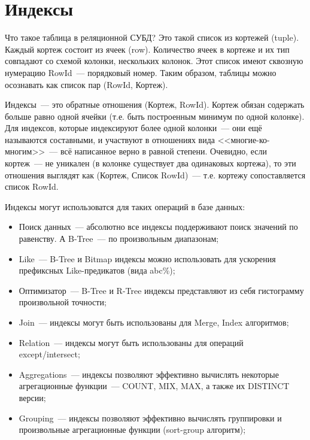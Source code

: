 \chapter{Индексы}

\begin{epigraphs}
\end{epigraphs}

Что такое таблица в реляционной СУБД? Это такой список из кортежей (tuple). Каждый кортеж состоит из ячеек (row). Количество ячеек в кортеже и их тип совпадают со схемой колонки, нескольких колонок. Этот список имеют сквозную нумерацию RowId~--- порядковый номер. Таким образом, таблицы можно осознавать как список пар (RowId, Кортеж).

Индексы~--- это обратные отношения (Кортеж, RowId). Кортеж обязан содержать больше равно одной ячейки (т.е. быть построенным минимум по одной колонке). Для индексов, которые индексируют более одной колонки~--- они ещё называются составными, и участвуют в отношениях вида <<многие-ко-многим>>~--- всё написанное верно в равной степени. Очевидно, если кортеж~--- не уникален (в колонке существует два одинаковых кортежа), то эти отношения выглядят как (Кортеж, Список RowId)~--- т.е. кортежу сопоставляется список RowId.

Индексы могут использоватся для таких операций в базе данных:

\begin{itemize}
  \item Поиск данных~--- абсолютно все индексы поддерживают поиск значений по равенству. А B-Tree~--- по произвольным диапазонам;
  \item Like~--- B-Tree и Bitmap индексы можно использовать для ускорения префиксных Like-предикатов (вида abc\%);
  \item Оптимизатор~--- B-Tree и R-Tree индексы представляют из себя гистограмму произвольной точности;
  \item Join~--- индексы могут быть использованы для Merge, Index алгоритмов;
  \item Relation~--- индексы могут быть использованы для операций except/intersect;
  \item Aggregations~--- индексы позволяют эффективно вычислять некоторые агрегационные функции~--- COUNT, MIX, MAX, а также их DISTINCT версии;
  \item Grouping~--- индексы позволяют эффективно вычислять группировки и произвольные агрегационные функции (sort-group алгоритм);
\end{itemize}




